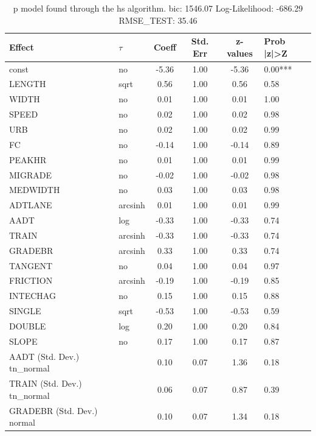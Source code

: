 \begin{table}
	\caption{p model found through the hs algorithm. bic: 1546.07 Log-Likelihood: -686.29 RMSE_TEST: 35.46}
	\begin{center}
		\begin{tabular}{|l|l|c|c|c|l|}
			\hline
			Effect & $\tau$ & Coeff & Std. Err & z-values & Prob |z|>Z \\
			\hline
			const & no & -5.36 & 1.00 & -5.36 & 0.00*** \\
			\hline
			LENGTH & sqrt & 0.56 & 1.00 & 0.56 & 0.58 \\
			\hline
			WIDTH & no & 0.01 & 1.00 & 0.01 & 1.00 \\
			\hline
			SPEED & no & 0.02 & 1.00 & 0.02 & 0.98 \\
			\hline
			URB & no & 0.02 & 1.00 & 0.02 & 0.99 \\
			\hline
			FC & no & -0.14 & 1.00 & -0.14 & 0.89 \\
			\hline
			PEAKHR & no & 0.01 & 1.00 & 0.01 & 0.99 \\
			\hline
			MIGRADE & no & -0.02 & 1.00 & -0.02 & 0.98 \\
			\hline
			MEDWIDTH & no & 0.03 & 1.00 & 0.03 & 0.98 \\
			\hline
			ADTLANE & arcsinh & 0.01 & 1.00 & 0.01 & 0.99 \\
			\hline
			AADT & log & -0.33 & 1.00 & -0.33 & 0.74 \\
			\hline
			TRAIN & arcsinh & -0.33 & 1.00 & -0.33 & 0.74 \\
			\hline
			GRADEBR & arcsinh & 0.33 & 1.00 & 0.33 & 0.74 \\
			\hline
			TANGENT & no & 0.04 & 1.00 & 0.04 & 0.97 \\
			\hline
			FRICTION & arcsinh & -0.19 & 1.00 & -0.19 & 0.85 \\
			\hline
			INTECHAG & no & 0.15 & 1.00 & 0.15 & 0.88 \\
			\hline
			SINGLE & sqrt & -0.53 & 1.00 & -0.53 & 0.59 \\
			\hline
			DOUBLE & log & 0.20 & 1.00 & 0.20 & 0.84 \\
			\hline
			SLOPE & no & 0.17 & 1.00 & 0.17 & 0.87 \\
			\hline
			AADT (Std. Dev.) tn_normal &  & 0.10 & 0.07 & 1.36 & 0.18 \\
			\hline
			TRAIN (Std. Dev.) tn_normal &  & 0.06 & 0.07 & 0.87 & 0.39 \\
			\hline
			GRADEBR (Std. Dev.) normal &  & 0.10 & 0.07 & 1.34 & 0.18 \\

\end{tabular}
\end{center}
\end{table}
